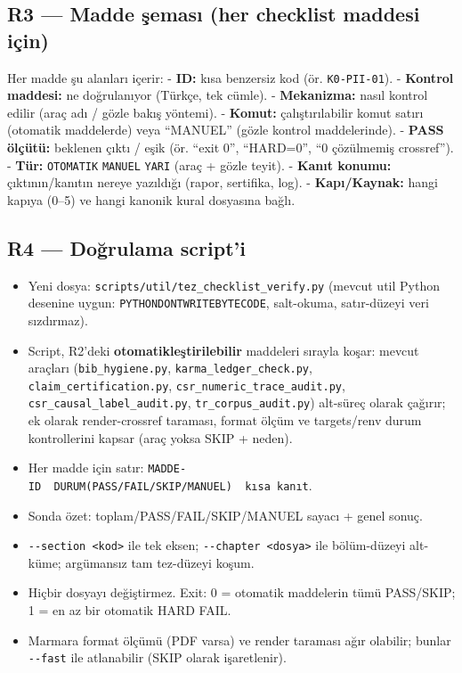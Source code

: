 \documentclass[
  turkish,
  12pt,
  a4paper,
]{report}
\providecommand{\tightlist}{%
  \setlength{\itemsep}{0pt}\setlength{\parskip}{0pt}}
\begin{document}
\subsection{R3 --- Madde şeması (her checklist maddesi
için)}\label{r3-madde-ux15femasux131-her-checklist-maddesi-iuxe7in}

Her madde şu alanları içerir: - \textbf{ID:} kısa benzersiz kod (ör.
\texttt{K0-PII-01}). - \textbf{Kontrol maddesi:} ne doğrulanıyor
(Türkçe, tek cümle). - \textbf{Mekanizma:} nasıl kontrol edilir (araç
adı / gözle bakış yöntemi). - \textbf{Komut:} çalıştırılabilir komut
satırı (otomatik maddelerde) veya ``MANUEL'' (gözle kontrol
maddelerinde). - \textbf{PASS ölçütü:} beklenen çıktı / eşik (ör. ``exit
0'', ``HARD=0'', ``0 çözülmemiş crossref''). - \textbf{Tür:}
\texttt{OTOMATIK} \textbar{} \texttt{MANUEL} \textbar{} \texttt{YARI}
(araç + gözle teyit). - \textbf{Kanıt konumu:} çıktının/kanıtın nereye
yazıldığı (rapor, sertifika, log). - \textbf{Kapı/Kaynak:} hangi kapıya
(0--5) ve hangi kanonik kural dosyasına bağlı.

\subsection{R4 --- Doğrulama script'i}\label{r4-doux11frulama-scripti}

\begin{itemize}
\tightlist
\item
  Yeni dosya: \texttt{scripts/util/tez\_checklist\_verify.py} (mevcut
  util Python desenine uygun: \texttt{PYTHONDONTWRITEBYTECODE},
  salt-okuma, satır-düzeyi veri sızdırmaz).
\item
  Script, R2'deki \textbf{otomatikleştirilebilir} maddeleri sırayla
  koşar: mevcut araçları (\texttt{bib\_hygiene.py},
  \texttt{karma\_ledger\_check.py}, \texttt{claim\_certification.py},
  \texttt{csr\_numeric\_trace\_audit.py},
  \texttt{csr\_causal\_label\_audit.py}, \texttt{tr\_corpus\_audit.py})
  alt-süreç olarak çağırır; ek olarak render-crossref taraması, format
  ölçüm ve targets/renv durum kontrollerini kapsar (araç yoksa SKIP +
  neden).
\item
  Her madde için satır:
  \texttt{MADDE-ID\ \ DURUM(PASS/FAIL/SKIP/MANUEL)\ \ kısa\ kanıt}.
\item
  Sonda özet: toplam/PASS/FAIL/SKIP/MANUEL sayacı + genel sonuç.
\item
  \texttt{-\/-section\ \textless{}kod\textgreater{}} ile tek eksen;
  \texttt{-\/-chapter\ \textless{}dosya\textgreater{}} ile bölüm-düzeyi
  alt-küme; argümansız tam tez-düzeyi koşum.
\item
  Hiçbir dosyayı değiştirmez. Exit: 0 = otomatik maddelerin tümü
  PASS/SKIP; 1 = en az bir otomatik HARD FAIL.
\item
  Marmara format ölçümü (PDF varsa) ve render taraması ağır olabilir;
  bunlar \texttt{-\/-fast} ile atlanabilir (SKIP olarak işaretlenir).
\end{itemize}
\end{document}

